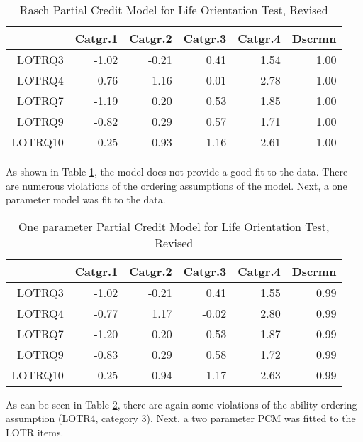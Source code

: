\documentclass{article}
\begin{document}
\begin{table}[ht]
\centering
\begin{tabular}{rrrrrr}
  \hline
 & Catgr.1 & Catgr.2 & Catgr.3 & Catgr.4 & Dscrmn \\ 
  \hline
LOTRQ3 & -1.02 & -0.21 & 0.41 & 1.54 & 1.00 \\ 
  LOTRQ4 & -0.76 & 1.16 & -0.01 & 2.78 & 1.00 \\ 
  LOTRQ7 & -1.19 & 0.20 & 0.53 & 1.85 & 1.00 \\ 
  LOTRQ9 & -0.82 & 0.29 & 0.57 & 1.71 & 1.00 \\ 
  LOTRQ10 & -0.25 & 0.93 & 1.16 & 2.61 & 1.00 \\ 
   \hline
\end{tabular}
\caption{Rasch Partial Credit Model for Life Orientation Test, Revised} 
\label{tab:lotrpcmrasch}
\end{table}
As shown in Table \ref{tab:lotrpcmrasch}, the model does not provide a good fit to the data. There are numerous violations of the ordering assumptions of the model. Next, a one parameter model was fit to the data. 

\begin{table}[ht]
\centering
\begin{tabular}{rrrrrr}
  \hline
 & Catgr.1 & Catgr.2 & Catgr.3 & Catgr.4 & Dscrmn \\ 
  \hline
LOTRQ3 & -1.02 & -0.21 & 0.41 & 1.55 & 0.99 \\ 
  LOTRQ4 & -0.77 & 1.17 & -0.02 & 2.80 & 0.99 \\ 
  LOTRQ7 & -1.20 & 0.20 & 0.53 & 1.87 & 0.99 \\ 
  LOTRQ9 & -0.83 & 0.29 & 0.58 & 1.72 & 0.99 \\ 
  LOTRQ10 & -0.25 & 0.94 & 1.17 & 2.63 & 0.99 \\ 
   \hline
\end{tabular}
\caption{One parameter Partial Credit Model for Life Orientation Test, Revised} 
\label{tab:lotrpcm1pl}
\end{table}
As can be seen in Table \ref{tab:lotrpcm1pl}, there are again some violations of the ability ordering assumption (LOTR4, category 3). Next, a two parameter PCM was fitted to the LOTR items. 
\end{document}
